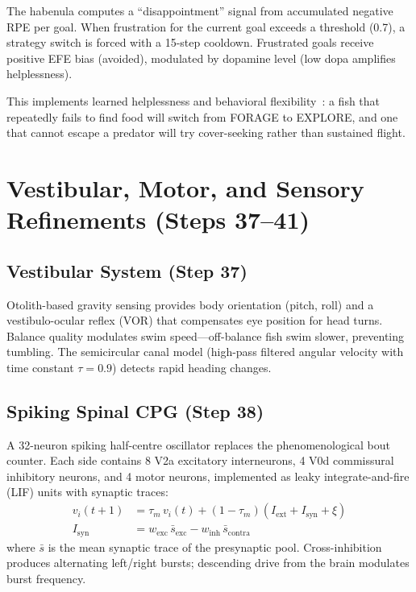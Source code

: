 \documentclass[11pt,a4paper]{article}
\begin{document}
The habenula computes a ``disappointment'' signal from accumulated
negative RPE per goal.  When frustration for the current goal exceeds
a threshold (0.7), a strategy switch is forced with a 15-step
cooldown.  Frustrated goals receive positive EFE bias (avoided),
modulated by dopamine level (low dopa amplifies helplessness).

This implements learned helplessness and behavioral
flexibility~\cite{amo2014}: a fish that repeatedly fails to find
food will switch from FORAGE to EXPLORE, and one that cannot escape
a predator will try cover-seeking rather than sustained flight.

\section{Vestibular, Motor, and Sensory Refinements (Steps 37--41)}\label{sec:refinements}

\subsection{Vestibular System (Step 37)}

Otolith-based gravity sensing provides body orientation (pitch, roll)
and a vestibulo-ocular reflex (VOR) that compensates eye position for
head turns.  Balance quality modulates swim speed---off-balance fish
swim slower, preventing tumbling.  The semicircular canal model
(high-pass filtered angular velocity with time constant $\tau = 0.9$)
detects rapid heading changes.

\subsection{Spiking Spinal CPG (Step 38)}

A 32-neuron spiking half-centre oscillator replaces the phenomenological
bout counter.  Each side contains 8 V2a excitatory interneurons,
4 V0d commissural inhibitory neurons, and 4 motor neurons, implemented
as leaky integrate-and-fire (LIF) units with synaptic traces:
\begin{align}
  v_i(t+1) &= \tau_m\,v_i(t) + (1-\tau_m)(I_\text{ext} + I_\text{syn} + \xi) \\
  I_\text{syn} &= w_\text{exc}\,\bar{s}_\text{exc} - w_\text{inh}\,\bar{s}_\text{contra}
\end{align}
where $\bar{s}$ is the mean synaptic trace of the presynaptic pool.
Cross-inhibition produces alternating left/right bursts; descending
drive from the brain modulates burst frequency.
\end{document}
